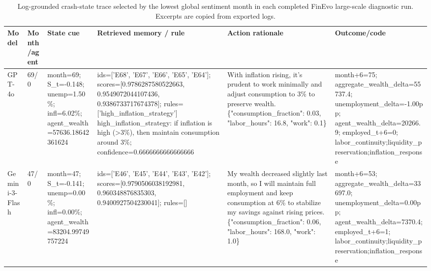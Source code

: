\ifdefined\FinEvoAllowHistoricalPrePZeroEvidence\else
{}
\fi
\begin{table}[t]
\centering
\scriptsize
\setlength{\tabcolsep}{3pt}
\begin{tabular}{llp{}p{}p{}p{}}
\toprule
Model & Month/agent & State cue & Retrieved memory / rule & Action rationale & Outcome/code \\
\midrule
GPT-4o & 69/0 & month=69; S\_t=-0.148; unemp=1.50\%; infl=6.02\%; agent\_wealth=57636.18642361624 & ids=['E68', 'E67', 'E66', 'E65', 'E64']; scores=[0.9786287580522663, 0.9549072044107436, 0.9386733717674378]; rules=['high\_inflation\_strategy'] high\_inflation\_strategy: if inflation is high (>3\%), then maintain consumption around 3\%; confidence=0.6666666666666666 & With inflation rising, it's prudent to work minimally and adjust consumption to 3\% to preserve wealth. \{"consumption\_fraction": 0.03, "labor\_hours": 16.8, "work": 0.1\} & month+6=75; aggregate\_wealth\_delta=55737.4; unemployment\_delta=-1.00pp; agent\_wealth\_delta=20266.9; employed\_t+6=0; labor\_continuity;liquidity\_preservation;inflation\_response \\
Gemini-3-Flash & 47/0 & month=47; S\_t=-0.141; unemp=0.00\%; infl=0.00\%; agent\_wealth=83204.99749757224 & ids=['E46', 'E45', 'E44', 'E43', 'E42']; scores=[0.9790506038192981, 0.960348876835303, 0.9400927504230041]; rules=[]  & My wealth decreased slightly last month, so I will maintain full employment and keep consumption at 6\% to stabilize my savings against rising prices. \{"consumption\_fraction": 0.06, "labor\_hours": 168.0, "work": 1.0\} & month+6=53; aggregate\_wealth\_delta=33697.0; unemployment\_delta=0.00pp; agent\_wealth\_delta=7370.4; employed\_t+6=1; labor\_continuity;liquidity\_preservation;inflation\_response \\
\bottomrule
\end{tabular}
\caption{Log-grounded crash-state trace selected by the lowest global sentiment month in each completed FinEvo large-scale diagnostic run. Excerpts are copied from exported logs.}
\label{tab:case_study_trace}
\end{table}
